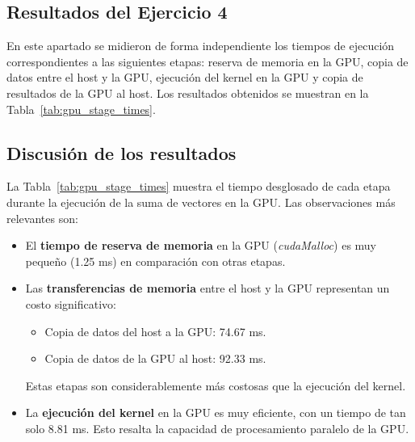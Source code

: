 \documentclass[twocolumn,a4paper,12pt]{article}
\begin{document}
\subsection{Resultados del Ejercicio 4}

En este apartado se midieron de forma independiente los tiempos de ejecución correspondientes a las siguientes etapas: reserva de memoria en la GPU, copia de datos entre el host y la GPU, ejecución del kernel en la GPU y copia de resultados de la GPU al host. Los resultados obtenidos se muestran en la Tabla~\ref{tab:gpu_stage_times}.

\begin{table}[H]
    \centering
    \caption{Tiempos de ejecución de cada etapa en la GPU}
    \label{tab:gpu_stage_times}
\end{table}

\subsection{Discusión de los resultados}

La Tabla~\ref{tab:gpu_stage_times} muestra el tiempo desglosado de cada etapa durante la ejecución de la suma de vectores en la GPU. Las observaciones más relevantes son:

\begin{itemize}
    \item El \textbf{tiempo de reserva de memoria} en la GPU (\textit{cudaMalloc}) es muy pequeño (1.25 ms) en comparación con otras etapas.
    \item Las \textbf{transferencias de memoria} entre el host y la GPU representan un costo significativo:
    \begin{itemize}
        \item Copia de datos del host a la GPU: 74.67 ms.
        \item Copia de datos de la GPU al host: 92.33 ms.
    \end{itemize}
    Estas etapas son considerablemente más costosas que la ejecución del kernel.
    \item La \textbf{ejecución del kernel} en la GPU es muy eficiente, con un tiempo de tan solo 8.81 ms. Esto resalta la capacidad de procesamiento paralelo de la GPU.
\end{itemize}
\end{document}
